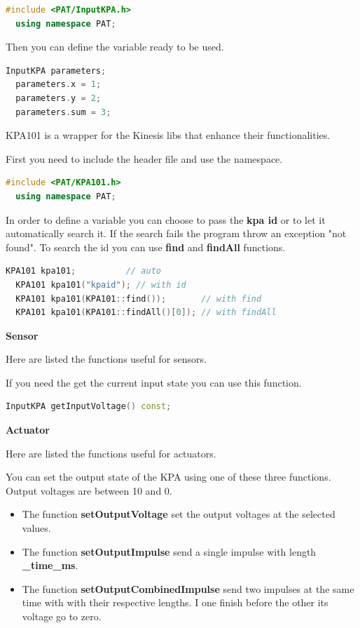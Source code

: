 \begin{lstlisting}[language=c++, gobble=2]
  #include <PAT/InputKPA.h>
  using namespace PAT;  
\end{lstlisting}

Then you can define the variable ready to be used.

\begin{lstlisting}[language=c++, gobble=2]
  InputKPA parameters;
  parameters.x = 1;
  parameters.y = 2;
  parameters.sum = 3;
\end{lstlisting}


KPA101 is a wrapper for the Kinesis libs that enhance their
functionalities.

First you need to include the header file and use the namespace.

\begin{lstlisting}[language=c++, gobble=2]
  #include <PAT/KPA101.h>
  using namespace PAT;
\end{lstlisting}

In order to define a variable you can choose to pass the \textbf{kpa id}
or to let it automatically search it. If the search fails the program
throw an exception "not found". To search the id you can use
\textbf{find} and \textbf{findAll} functions.

\begin{lstlisting}[language=c++, gobble=2]
  KPA101 kpa101;          // auto
  KPA101 kpa101("kpaid"); // with id
  KPA101 kpa101(KPA101::find());       // with find
  KPA101 kpa101(KPA101::findAll()[0]); // with findAll
\end{lstlisting}

\textbf{Sensor}

Here are listed the functions useful for sensors.

If you need the get the current input state you can use this function.

\begin{lstlisting}[language=c++, gobble=2]
  InputKPA getInputVoltage() const;
\end{lstlisting}

\textbf{Actuator}

Here are listed the functions useful for actuators.

You can set the output state of the KPA using one of these three
functions. Output voltages are between 10 and 0.

\begin{itemize}
  \tightlist
  \item
        The function \textbf{setOutputVoltage} set the output voltages at the
        selected values.
  \item
        The function \textbf{setOutputImpulse} send a single impulse with
        length \textbf{\_time\_ms}.
  \item
        The function \textbf{setOutputCombinedImpulse} send two impulses at
        the same time with with their respective lengths. I one finish before
        the other its voltage go to zero.
\end{itemize}

